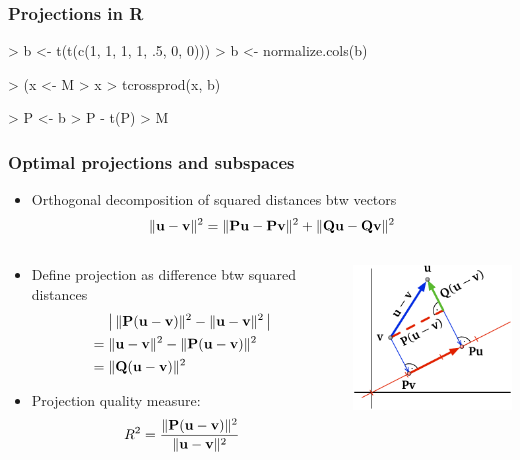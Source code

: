 \documentclass[t]{beamer} %
\begin{document}
\begin{frame}[fragile]
  \frametitle{Projections in R}

  \begin{Rcode}
> b <- t(t(c(1, 1, 1, 1, .5, 0, 0)))
> b <- normalize.cols(b) 

> (x <- M %
> x %
> tcrossprod(x, b) 

> P <- b %
> P - t(P)         
> M %
\end{Rcode}

\end{frame}

\begin{frame}
  \frametitle{Optimal projections and subspaces}

  \begin{itemize}
  \item Orthogonal decomposition of squared distances btw vectors
    \[
      \norm{\vu - \vv}^2 = \norm{\mathbf{P} \vu - \mathbf{P} \vv}^2 + \norm{\mathbf{Q} \vu - \mathbf{Q} \vv}^2
    \]
  \end{itemize}

  \begin{columns}[c]
    \begin{column}{60mm}
      \begin{itemize}
      \item<2-> Define projection  as difference btw squared distances
        \begin{align*}
          & \bigabs{\,\norm{\mathbf{P}(\vu - \vv)}^2 - \norm{\vu - \vv}^2\,} \\
          =\;& \norm{\vu - \vv}^2 - \norm{\mathbf{P}(\vu - \vv)}^2 \\
          =\;& \norm{\mathbf{Q}(\vu - \vv)}^2
        \end{align*}
      \item<3-> Projection quality measure:
        \[
          R^2 = \frac{\norm{\mathbf{P}(\vu - \vv)}^2}{\norm{\vu - \vv}^2}
        \]
      \end{itemize}
    \end{column}
    \begin{column}{40mm}
      \hspace*{-5mm}%
      \includegraphics[width=45mm]{img/4_projection_loss}      
    \end{column}
  \end{columns}
\end{frame}
\end{document}

